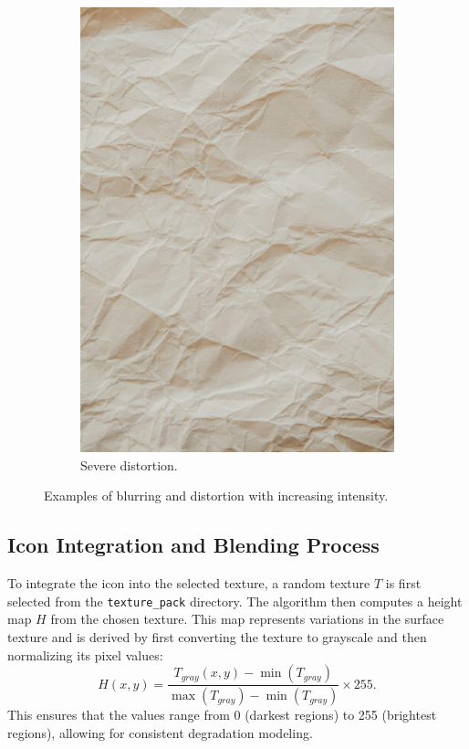 \begin{figure}
\begin{subfigure}{0.3\textwidth}
        \includegraphics[width=\textwidth]{images/001.jpg}
        \caption{Severe distortion.}
    \end{subfigure}
    \caption{Examples of blurring and distortion with increasing intensity.}\label{fig:smudged-paper}
\end{figure}

\subsection{Icon Integration and Blending Process}

To integrate the icon into the selected texture, a random texture $T$ is first selected from the \texttt{texture\_pack} directory. The algorithm then computes a height map $H$ from the chosen texture. This map represents variations in the surface texture and is derived by first converting the texture to grayscale and then normalizing its pixel values:
\begin{equation}
    H(x, y) = \frac{T_{gray}(x, y) - \min(T_{gray})}{\max(T_{gray}) - \min(T_{gray})} \times 255.
\end{equation}
This ensures that the values range from 0 (darkest regions) to 255 (brightest regions), allowing for consistent degradation modeling.

